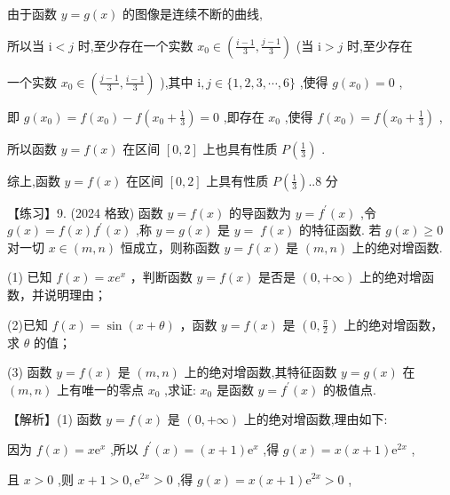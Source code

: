 \documentclass[10pt]{article}
\begin{document}
由于函数 \(y = g\left( x\right)\) 的图像是连续不断的曲线,

所以当 \(\mathrm{i} < j\) 时,至少存在一个实数 \({x}_{0} \in  \left( {\frac{i - 1}{3},\frac{j - 1}{3}}\right)\) (当 \(\mathrm{i} > j\) 时,至少存在

一个实数 \({x}_{0} \in  \left( {\frac{j - 1}{3},\frac{i - 1}{3}}\right)\) ),其中 \(\mathrm{i},j \in  \{ 1,2,3,\cdots ,6\}\) ,使得 \(g\left( {x}_{0}\right)  = 0\) ,

即 \(g\left( {x}_{0}\right)  = f\left( {x}_{0}\right)  - f\left( {{x}_{0} + \frac{1}{3}}\right)  = 0\) ,即存在 \({x}_{0}\) ,使得 \(f\left( {x}_{0}\right)  = f\left( {{x}_{0} + \frac{1}{3}}\right)\) ,

所以函数 \(y = f\left( x\right)\) 在区间 \(\left\lbrack  {0,2}\right\rbrack\) 上也具有性质 \(P\left( \frac{1}{3}\right)\) .

综上,函数 \(y = f\left( x\right)\) 在区间 \(\left\lbrack  {0,2}\right\rbrack\) 上具有性质 \(P\left( \frac{1}{3}\right) ..8\) 分

【练习】9. (2024 格致) 函数 \(y = f\left( x\right)\) 的导函数为 \(y = {f}^{\prime }\left( x\right)\) ,令 \(g\left( x\right)  = f\left( x\right) {f}^{\prime }\left( x\right)\) ,称 \(y = g\left( x\right)\) 是 \(y = \; f\left( x\right)\) 的特征函数. 若 \(g\left( x\right)  \geq  0\) 对一切 \(x \in  \left( {m,n}\right)\) 恒成立，则称函数 \(y = f\left( x\right)\) 是 \(\left( {m,n}\right)\) 上的绝对增函数.

(1) 已知 \(f\left( x\right)  = x{e}^{x}\) ，判断函数 \(y = f\left( x\right)\) 是否是 \(\left( {0, + \infty }\right)\) 上的绝对增函数，并说明理由；

(2)已知 \(f\left( x\right)  = \sin \left( {x + \theta }\right)\) ，函数 \(y = f\left( x\right)\) 是 \(\left( {0,\frac{\pi }{2}}\right)\) 上的绝对增函数，求 \(\theta\) 的值；

(3) 函数 \(y = f\left( x\right)\) 是 \(\left( {m,n}\right)\) 上的绝对增函数,其特征函数 \(y = g\left( x\right)\) 在 \(\left( {m,n}\right)\) 上有唯一的零点 \({x}_{0}\) ,求证: \({x}_{0}\) 是函数 \(y = {f}^{\prime }\left( x\right)\) 的极值点.

【解析】(1) 函数 \(y = f\left( x\right)\) 是 \(\left( {0, + \infty }\right)\) 上的绝对增函数,理由如下:

因为 \(f\left( x\right)  = x{\mathrm{e}}^{x}\) ,所以 \({f}^{\prime }\left( x\right)  = \left( {x + 1}\right) {\mathrm{e}}^{x}\) ,得 \(g\left( x\right)  = x\left( {x + 1}\right) {\mathrm{e}}^{2x}\) ,

且 \(x > 0\) ,则 \(x + 1 > 0,{\mathrm{e}}^{2x} > 0\) ,得 \(g\left( x\right)  = x\left( {x + 1}\right) {\mathrm{e}}^{2x} > 0\) ,
\end{document}
